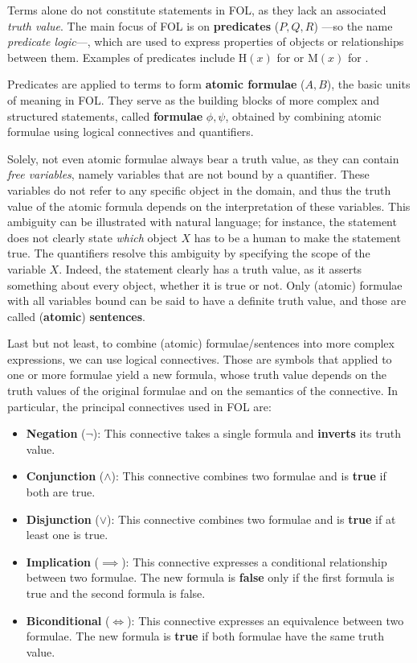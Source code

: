 Terms alone do not constitute statements in FOL, as they lack an associated \emph{truth value}.
The main focus of FOL is on \textbf{predicates} (\(P,Q,R\)) ---so the name \emph{predicate logic}---, which are used to express properties of objects or relationships between them.
Examples of predicates include \(\text{H}(x)\) for  or \(\text{M}(x)\) for .


Predicates are applied to terms to form \textbf{atomic formulae} (\(A,B\)), the basic units of meaning in FOL\@. They serve as the building blocks of more complex and structured statements, called \textbf{formulae} \(\phi, \psi\), obtained by combining atomic formulae using logical connectives and quantifiers.

Solely, not even atomic formulae always bear a truth value, as they can contain \emph{free variables}, namely variables that are not bound by a quantifier. These variables do not refer to any specific object in the domain, and thus the truth value of the atomic formula depends on the interpretation of these variables.
This ambiguity can be illustrated with natural language; for instance, the statement  does not clearly state \emph{which} object \(X\) has to be a human to make the statement true.
The quantifiers resolve this ambiguity by specifying the scope of the variable \(X\). Indeed, the statement  clearly has a truth value, as it asserts something about every object, whether it is true or not.
Only (atomic) formulae with all variables bound can be said to have a definite truth value, and those are called (\textbf{atomic}) \textbf{sentences}.

Last but not least, to combine (atomic) formulae/sentences into more complex expressions, we can use logical connectives. Those are symbols that applied to one or more formulae yield a new formula, whose truth value depends on the truth values of the original formulae and on the semantics of the connective.
In particular, the principal connectives used in FOL are:

\begin{itemize}
  \item \textbf{Negation} (\(\neg\)): This connective takes a single formula and \textbf{inverts} its truth value.
  \item \textbf{Conjunction} (\(\land\)): This connective combines two formulae and is \textbf{true} if both are true.
  \item \textbf{Disjunction} (\(\lor\)): This connective combines two formulae and is \textbf{true} if at least one is true.
  \item \textbf{Implication} (\(\implies\)): This connective expresses a conditional relationship between two formulae. The new formula is \textbf{false} only if the first formula is true and the second formula is false.
  \item \textbf{Biconditional} (\(\iff\)): This connective expresses an equivalence between two formulae. The new formula is \textbf{true} if both formulae have the same truth value.
\end{itemize}

